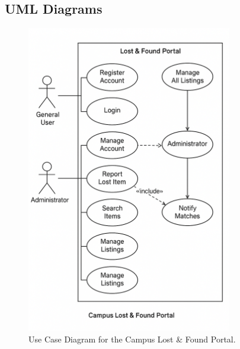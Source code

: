 \documentclass[11pt, a4paper]{article}
\begin{document}
\subsection{UML Diagrams}
\begin{figure}[h!]
    \centering
    \includegraphics[width=0.8\textwidth]{use-case-diagram.png}
    \caption{Use Case Diagram for the Campus Lost \& Found Portal.}
    \label{fig:usecase}
\end{figure}
\newpage
\end{document}
